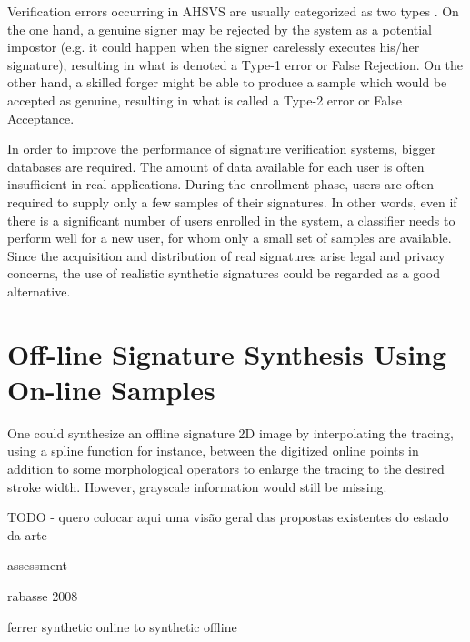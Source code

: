 Verification errors occurring in AHSVS are usually categorized as two types \cite{fairhurst1997signature}. On the one hand, a genuine signer may be rejected by the system as a potential impostor (e.g. it could happen when the signer carelessly executes his/her signature), resulting in what is denoted a Type-1 error or False
Rejection. On the other hand, a skilled forger might be able to produce a sample which would be accepted as genuine, resulting in what is called a Type-2 error or False Acceptance. 

In order to improve the performance of signature verification
systems, bigger databases are required. The amount of data available for each user is often
insufficient in real applications. During the enrollment phase,
users are often required to supply only a few samples of their
signatures. In other words, even if there is a significant number
of users enrolled in the system, a classifier needs to perform
well for a new user, for whom only a small set of samples are
available. Since the acquisition
and distribution of real signatures arise legal and privacy
concerns, the use of realistic synthetic signatures could be
regarded as a good alternative. 

\section{Off-line Signature Synthesis Using On-line Samples}
One could synthesize an offline signature 2D image by interpolating the tracing, using a spline function for instance, between the digitized online points in addition to some morphological operators to enlarge the tracing to the desired stroke width. However, grayscale information would still be missing. 

TODO - quero colocar aqui uma visão geral das propostas existentes do estado da arte

assessment \cite{guest2013assessment}

rabasse 2008 \cite{rabasse2008new}

ferrer synthetic online to synthetic offline \cite{ferrer2013realistic}

\cite{diaz2014generation}

\cite{diaz2014cognitive}

